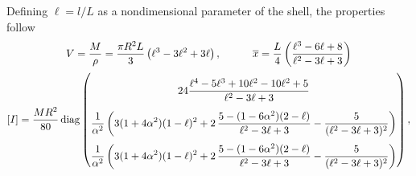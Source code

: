 \documentclass[11pt,dvipsnames]{thesis}
\begin{document}
Defining $\ell = l/L$ as a nondimensional parameter of the shell, the properties follow
\begin{gather}
V = \frac{M}{\rho} = \frac{\pi R^2 L}{3} \left(\ell^3 - 3\ell^2 + 3\ell\right), \qquad\quad \overline{x} = \frac{L}{4} \left(\frac{\ell^3 - 6\ell + 8}{\ell^2 - 3\ell + 3}\right) 
\\
[I] = \frac{M R^2}{80} \operatorname{diag}
\renewcommand\arraystretch{2.6}
\begin{pmatrix}
\displaystyle 24 \frac{\ell^4 - 5\ell^3 + 10\ell^2 - 10\ell^2 +  5}{\ell^2 - 3\ell + 3} \\
\displaystyle \frac{1}{\alpha^2} \left( 3 (1 + 4 \alpha^2) (1 - \ell)^2 + 2 \,\frac{5 - (1 - 6\alpha^2) (2 - \ell)}{\ell^2 - 3\ell + 3} - \frac{5}{(\ell^2 - 3\ell + 3)^2}\right) \\
\displaystyle \frac{1}{\alpha^2} \left( 3 (1 + 4 \alpha^2) (1 - \ell)^2 + 2 \,\frac{5 - (1 - 6\alpha^2) (2 - \ell)}{\ell^2 - 3\ell + 3} - \frac{5}{(\ell^2 - 3\ell + 3)^2}\right) 
\end{pmatrix},
\end{gather}
\end{document}
